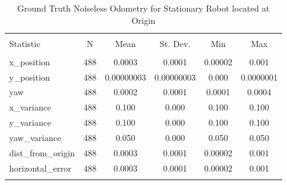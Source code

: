 
\begin{table}[h] \centering 
  \caption{Ground Truth Noiseless Odometry for Stationary Robot located at Origin} 
  \label{tab:gazebo_stationary_noiseless_summary} 
\begin{tabular}{@{\extracolsep{5pt}}lccccc} 
\\[-1.8ex]\hline 
\hline \\[-1.8ex] 
Statistic & \multicolumn{1}{c}{N} & \multicolumn{1}{c}{Mean} & \multicolumn{1}{c}{St. Dev.} & \multicolumn{1}{c}{Min} & \multicolumn{1}{c}{Max} \\ 
\hline \\[-1.8ex] 
x\_position & 488 & 0.0003 & 0.0001 & 0.00002 & 0.001 \\ 
y\_position & 488 & 0.00000003 & 0.00000003 & 0.000 & 0.0000001 \\ 
yaw & 488 & 0.0002 & 0.0001 & 0.0001 & 0.0004 \\ 
x\_variance & 488 & 0.100 & 0.000 & 0.100 & 0.100 \\ 
y\_variance & 488 & 0.100 & 0.000 & 0.100 & 0.100 \\ 
yaw\_variance & 488 & 0.050 & 0.000 & 0.050 & 0.050 \\ 
dist\_from\_origin & 488 & 0.0003 & 0.0001 & 0.00002 & 0.001 \\ 
horizontal\_error & 488 & 0.0003 & 0.0001 & 0.00002 & 0.001 \\ 
\hline \\[-1.8ex] 
\end{tabular} 
\end{table} 
